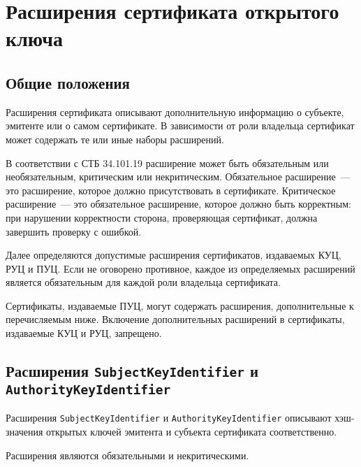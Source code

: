 \section{Расширения сертификата открытого ключа}\label{FMT.Ext}

\subsection{Общие положения}\label{FMT.Ext.Intro} 

Расширения сертификата описывают дополнительную информацию о субъекте,
эмитенте или о самом сертификате. В зависимости от роли владельца 
сертификат может содержать те или иные наборы расширений.

В соответствии с СТБ 34.101.19 расширение может быть обязательным или 
необязательным, критическим или некритическим. 
Обязательное расширение~--- это расширение, которое должно присутствовать 
в сертификате.  Критическое расширение~--- это обязательное  
расширение, которое должно быть корректным: при нарушении корректности
сторона, проверяющая сертификат, должна завершить проверку с ошибкой.

Далее определяются допустимые расширения сертификатов, издаваемых КУЦ, РУЦ и ПУЦ. 
Если не оговорено противное, каждое из определяемых расширений является 
обязательным для каждой роли владельца сертификата. 

Сертификаты, издаваемые ПУЦ, могут содержать расширения, 
дополнительные к перечисляемым ниже. Включение дополнительных расширений в 
сертификаты, издаваемые КУЦ и РУЦ, запрещено.


\subsection{Расширения \texttt{SubjectKeyIdentifier} и 
\texttt{AuthorityKeyIdentifier}}\label{FMT.Ext.SKID} 

Расширения \texttt{SubjectKeyIdentifier} и \texttt{AuthorityKeyIdentifier} 
описывают хэш-значения открытых ключей эмитента и субъекта сертификата 
соответственно. 

Расширения являются обязательными и некритическими.
 
